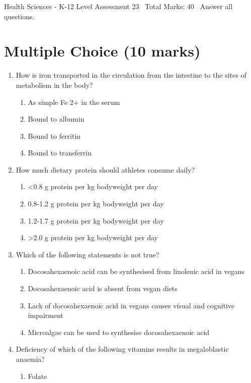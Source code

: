 \documentclass[12pt]{article}
\begin{document}
\begin{center}
Health Sciences - K-12 Level Assessment 23 \
Total Marks: 40 \
Answer all questions.
\end{center}

\section*{Multiple Choice (10 marks)}
\begin{enumerate}[label=\arabic*.]
\item How is iron transported in the circulation from the intestine to the sites of metabolism in the body?
\begin{enumerate}[label=(\alph*)]
    \item As simple Fe 2+ in the serum
    \item Bound to albumin
    \item Bound to ferritin
    \item Bound to transferrin
\end{enumerate}
\item How much dietary protein should athletes consume daily?
\begin{enumerate}[label=(\alph*)]
    \item \textless{}0.8 g protein per kg bodyweight per day
    \item 0.8-1.2 g protein per kg bodyweight per day
    \item 1.2-1.7 g protein per kg bodyweight per day
    \item \textgreater{}2.0 g protein per kg bodyweight per day
\end{enumerate}
\item Which of the following statements is not true?
\begin{enumerate}[label=(\alph*)]
    \item Docosahexaenoic acid can be synthesised from linolenic acid in vegans
    \item Docosahexaenoic acid is absent from vegan diets
    \item Lack of docosahexaenoic acid in vegans causes visual and cognitive impairment
    \item Microalgae can be used to synthesise docosahexaenoic acid
\end{enumerate}
\item Deficiency of which of the following vitamins results in megaloblastic anaemia?
\begin{enumerate}[label=(\alph*)]
    \item Folate

\end{enumerate}
\end{enumerate}
\end{document}
